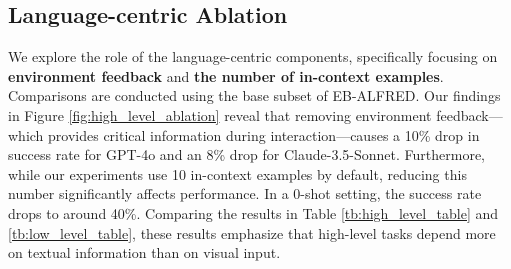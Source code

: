 \subsection{Language-centric Ablation}\label{sec:language_ablation}







We explore the role of the language-centric components, specifically focusing on \textbf{environment feedback} and \textbf{the number of in-context examples}. Comparisons are conducted using the base subset of EB-ALFRED. Our findings in Figure \ref{fig:high_level_ablation} reveal that removing environment feedback—which provides critical information during interaction—causes a 10\% drop in success rate for GPT-4o and an 8\% drop for Claude-3.5-Sonnet. Furthermore, while our experiments use 10 in-context examples by default, reducing this number significantly affects performance. In a 0-shot setting, the success rate drops to around 40\%. Comparing the results in Table \ref{tb:high_level_table} and \ref{tb:low_level_table}, these results emphasize that high-level tasks depend more on textual information than on visual input.


